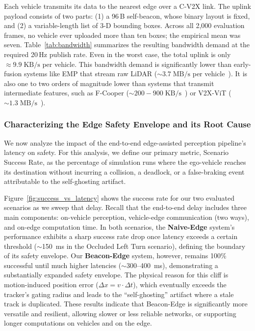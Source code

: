 

Each vehicle transmits its data to the nearest edge over a C-V2X link. The uplink payload consists of two parts: (1) a 96\,B self-beacon, whose binary layout is fixed, and (2) a variable-length list of 3-D bounding boxes. Across all 2,000 evaluation frames, no vehicle ever uploaded more than ten boxes; the empirical mean was seven. Table~\ref{tab:bandwidth} summarizes the resulting bandwidth demand at the required 20\,Hz publish rate. Even in the worst case, the total uplink is only \(\approx 9.9\;\mathrm{KB/s}\) per vehicle. This bandwidth demand is significantly lower than early-fusion systems like EMP that stream raw LiDAR (\(\sim\!3.7\;\mathrm{MB/s}\) per vehicle~\cite{EMP, Autocast, harbor}). It is also one to two orders of magnitude lower than systems that transmit intermediate features, such as F-Cooper (\(\sim\!200-900\;\mathrm{KB/s}\)~\cite{fcooper}) or V2X-ViT (\(\sim\!1.3\;\mathrm{MB/s}\)~\cite{v2xvit2022}).

\subsubsection{Characterizing the Edge Safety Envelope and its Root Cause}

We now analyze the impact of the end-to-end edge-assisted perception pipeline's latency on safety. For this analysis, we define our primary metric, Scenario Success Rate, as the percentage of simulation runs where the ego-vehicle reaches its destination without incurring a collision, a deadlock, or a false-braking event attributable to the self-ghosting artifact.

Figure~\ref{fig:success_vs_latency} shows the success rate for our two evaluated scenarios as we sweep that delay. 
Recall that the end-to-end delay includes three main components: on-vehicle perception, vehicle-edge communication (two ways), and on-edge computation time.
In both scenarios, the \textbf{Naive-Edge} system's performance exhibits a sharp success rate drop once latency exceeds a certain threshold ($\sim$150~ms in the Occluded Left Turn scenario), defining the boundary of its safety envelope. Our \textbf{Beacon-Edge} system, however, remains 100\% successful until much higher latencies ($\sim$300--400~ms), demonstrating a substantially expanded safety envelope. The physical reason for this cliff is motion-induced position error ($\Delta x = v \cdot \Delta t$), which eventually exceeds the tracker's gating radius and leads to the ``self-ghosting'' artifact where a stale track is duplicated.
These results indicate that Beacon-Edge is significantly more versatile and resilient, allowing slower or less reliable networks, or supporting longer computations on vehicles and on the edge.

